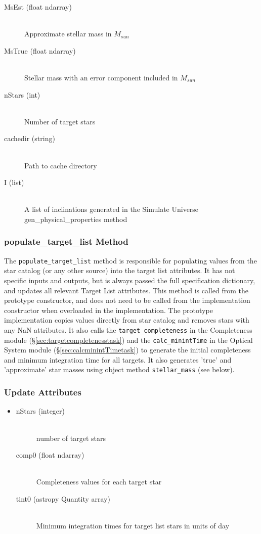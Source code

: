 \documentclass[cleanfoot]{asme2ej}
\begin{document}
\begin{itemize}
\begin{description}
    \item[MsEst (float ndarray)] \hfill \\ Approximate stellar mass in $ M_{sun} $
    \item[MsTrue (float ndarray)] \hfill \\ Stellar mass with an error component included in $ M_{sun} $
    \item[nStars (int)] \hfill \\ Number of target stars
    \item[cachedir (string)] \hfill \\ Path to cache directory
    \item[I (list)] \hfill \\ A list of inclinations generated in the Simulate Universe gen\_physical\_properties method
\end{description}
\end{itemize}

\subsubsection{populate\_target\_list Method} \label{sec:populatetargetlisttask}
The \verb+populate_target_list+ method is responsible for populating values from the star catalog  (or any other source) into the target list attributes. It has not specific inputs and outputs, but is always passed the full specification dictionary, and updates all relevant Target List attributes.  This method is called from the prototype constructor, and does not need to be called from the implementation constructor when overloaded in the implementation.   The prototype implementation copies values directly from star catalog and removes stars with any NaN attributes. It also calls the \verb+target_completeness+ in the Completeness module (\S\ref{sec:targetcompletenesstask}) and the \verb+calc_minintTime+ in the Optical System module (\S\ref{sec:calcminintTimetask}) to generate the initial completeness and minimum integration time for all targets.  It also generates 'true' and 'approximate' star masses using object method \verb+stellar_mass+ (see below).
\subsubsection*{Update Attributes}
\begin{itemize}
\item
\begin{description}
    \item[nStars (integer)] \hfill \\ number of target stars
    \item[comp0 (float ndarray)] \hfill \\ Completeness values for each target star
    \item[tint0 (astropy Quantity array)] \hfill \\ Minimum integration times for target list stars in units of day
\end{description}
\end{itemize}
\end{document}
